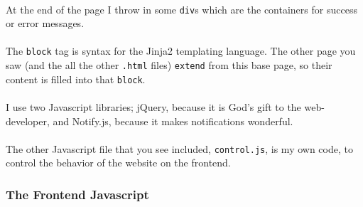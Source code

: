 \documentclass[11pt]{article}
\begin{document}
	\paragraph{}  At the end of the page I throw in some \texttt{div}s which are the containers for success or error messages.

	\paragraph{} The \texttt{block} tag is syntax for the Jinja2 templating language. The other page you saw (and the all the other \texttt{.html} files) \texttt{extend} from this base page, so their content is filled into that \texttt{block}.

	\paragraph{} I use two Javascript libraries; jQuery, because it is God's gift to the web-developer, and Notify.js, because it makes notifications wonderful.

	\paragraph{} The other Javascript file that you see included, \texttt{control.js}, is my own code, to control the behavior of the website on the frontend.

	\paragraph{} 

	\begin{center}
		\graphicspath{ {.} }
		\centering
	\end{center}
	
	\newpage

	\subsubsection{The Frontend Javascript}
\end{document}
